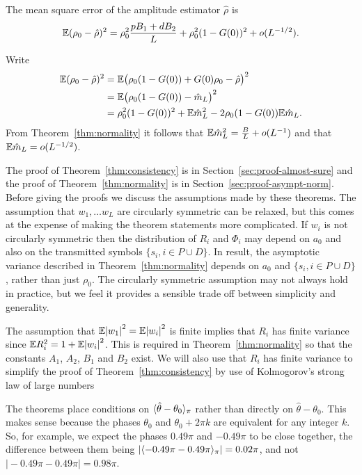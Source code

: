 \documentclass[journal]{IEEEtran}
\begin{document}
\begin{corollary}\label{cor:ampmse}
The mean square error of the amplitude estimator $\hat{\rho}$ is 
\[
{\mathbb E} (\rho_0 - \hat{\rho})^2 = \rho_0^2\frac{p B_1 + d B_2}{L} + \rho_0^2(1 - G(0))^2 + o(L^{-1/2}).
\] 
\end{corollary}
\begin{IEEEproof} Write
\begin{align*}
{\mathbb E} (\rho_0 - \hat{\rho})^2 &= {\mathbb E} \big( \rho_0(1 - G(0)) + G(0)\rho_0 - \hat{\rho} \big)^2 \\
&= {\mathbb E} \big( \rho_0(1 - G(0)) - \hat{m}_L \big)^2 \\
&= \rho_0^2(1 - G(0))^2 + {\mathbb E} \hat{m}_L^2 - 2\rho_0(1 - G(0)){\mathbb E}\hat{m}_L.
\end{align*} 
From Theorem~\ref{thm:normality} it follows that ${\mathbb E} \hat{m}_L^2 = \tfrac{B}{L} + o(L^{-1})$ and that ${\mathbb E} \hat{m}_L = o(L^{-1/2})$. 
\end{IEEEproof}

The proof of Theorem~\ref{thm:consistency} is in Section~\ref{sec:proof-almost-sure} and the proof of Theorem~\ref{thm:normality} is in Section~\ref{sec:proof-asympt-norm}.  Before giving the proofs we discuss the assumptions made by these theorems.  The assumption that $w_1, \dots w_L$ are circularly symmetric can be relaxed, but this comes at the expense of making the theorem statements more complicated.  If $w_i$ is not circularly symmetric then the distribution of $R_i$ and $\Phi_i$ may depend on $a_0$ and also on the transmitted symbols $\{s_i,i \in P \cup D\}$.  In result, the asymptotic variance described in Theorem~\ref{thm:normality} depends on $a_0$ and $\{s_i,i \in P \cup D\}$, rather than just $\rho_0$.  The circularly symmetric assumption may not always hold in practice, but we feel it provides a sensible trade off between simplicity and generality.  

The assumption that ${\mathbb E} {\vert w_1 \vert}^2 = {\mathbb E} {\vert w_i \vert}^2$ is finite implies that $R_i$ has finite variance since ${\mathbb E} R_i^2 = 1 + {\mathbb E} {\left\vert w_i \right\vert}^2$.  This is required in Theorem~\ref{thm:normality} so that the constants $A_1$, $A_2$, $B_1$ and $B_2$ exist.  We will also use that $R_i$ has finite variance to simplify the proof of Theorem~\ref{thm:consistency} by use of Kolmogorov's strong law of large numbers~\cite[Theorem 2.3.10]{SenSinger_large_sample_stats_1993}


The theorems place conditions on $\langle \hat{\theta} - \theta_0 \rangle_\pi$ rather than directly on $\hat{\theta} - \theta_0$.  This makes sense because the phases $\theta_0$ and $\theta_0 + 2\pi k$ are equivalent for any integer $k$. So, for example, we expect the phases $0.49\pi$ and $-0.49\pi$ to be close together, the difference between them being $\vert\langle -0.49\pi - 0.49\pi \rangle_\pi\vert = 0.02\pi$, and not $\vert -0.49\pi - 0.49\pi\vert = 0.98\pi$.
\end{document}
